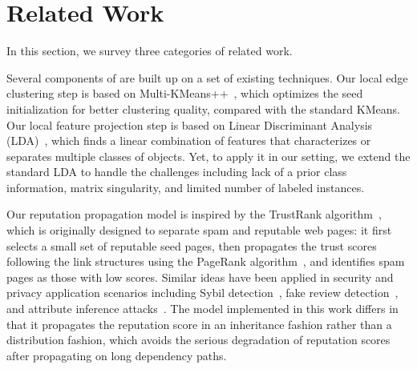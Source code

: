 
\section{Related Work}
\label{sec:literature}

In this section, we survey three categories of related work.

Several components of \tool are built up on a set of existing techniques. Our local edge clustering step is based on Multi-KMeans++~\cite{Arthur:2007:KAC:1283383.1283494}, which optimizes the seed initialization
for better clustering quality, compared with the standard KMeans. Our local feature projection step is 
based on Linear Discriminant Analysis (LDA)~\cite{Mika99fisherdiscriminant}, which finds a linear combination of features that characterizes or separates multiple classes of objects. Yet, to apply it in our setting, we extend the standard LDA to handle the challenges including lack of a prior class information, matrix singularity, and limited number of labeled instances. 

Our reputation propagation model is inspired by the TrustRank algorithm~\cite{Gyongyi:2004:vldb}, which is originally designed to separate spam and reputable web pages: it first selects a small set of reputable seed pages, then propagates the trust scores following the link structures using the PageRank algorithm~\cite{Page:techreport:1998}, and identifies spam pages as those with low scores. Similar ideas have been applied in security and privacy application scenarios
including Sybil detection~\cite{cao2012sybilrank,Gong:2014:tifs,gao2018sybilfuse}, fake review detection~\cite{Rayana:2015:COS:2783258.2783370}, and attribute inference attacks~\cite{jia2017attriinfer,wang2018graph}.
The model implemented in this work differs in that it propagates the reputation score in an inheritance fashion rather than a distribution fashion, which avoids the serious degradation of reputation scores after propagating on long dependency paths.


